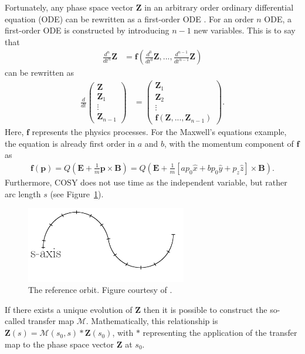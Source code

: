 Fortunately, any phase space vector $\mathbf{Z}$ in an arbitrary order ordinary differential equation (ODE) can be rewritten as a first-order ODE \cite{modernMapMethods}. For an order $n$ ODE, a first-order ODE is constructed by introducing $n-1$ new variables. This is to say that
\begin{align} \nonumber
\frac{d^n}{dt^n}\mathbf{Z}&=\mathbf{f}(\frac{d^0}{dt^0}\mathbf{Z},...,\frac{d^{n-1}}{dt^{n-1}}\mathbf{Z})
\end{align}
can be rewritten as
\begin{align} \nonumber
\frac{d}{dt} \begin{pmatrix}
		\mathbf{Z} \\ \mathbf{Z}_1 \\ \vdots \\ \mathbf{Z}_{n-1}
		\end{pmatrix}
&= 		\begin{pmatrix}
		\mathbf{Z}_1 \\ \mathbf{Z}_2 \\ \vdots \\ \mathbf{f}(\mathbf{Z},...,\mathbf{Z}_{n-1})
		\end{pmatrix}.
\end{align}
Here, $\mathbf{f}$ represents the physics processes. For the Maxwell's equations example, the equation is already first order in $a$ and $b$, with the momentum component of $\mathbf{f}$ as
\begin{align}\nonumber
\mathbf{f}(\mathbf{p})=Q(\mathbf{E}+\frac{1}{m}\mathbf{p}\times\mathbf{B})=Q(\mathbf{E}+\frac{1}{m}\left[ap_0 \hat{x} + bp_0\hat{y} + p_z \hat{z}\right]\times\mathbf{B}).
\end{align}
 Furthermore, COSY does not use time as the independent variable, but rather arc length $s$ (see Figure~\ref{fig:saxis}).

\begin{figure}[h!]
\centering
\includegraphics*[width=70mm]{./Figures/saxis}
\caption[The reference orbit.]{The reference orbit. Figure courtesy of \cite{berzFullnotes}.}
\label{fig:saxis}
\end{figure}

If there exists a unique evolution of $\mathbf{Z}$ then it is possible to construct the so-called transfer map $\mathcal{M}$. Mathematically, this relationship is $\mathbf{Z}(s)=\mathcal{M}(s_0 , s)*\mathbf{Z}(s_0)$, with $*$ representing the application of the transfer map to the phase space vector $\mathbf{Z}$ at $s_0$. 

